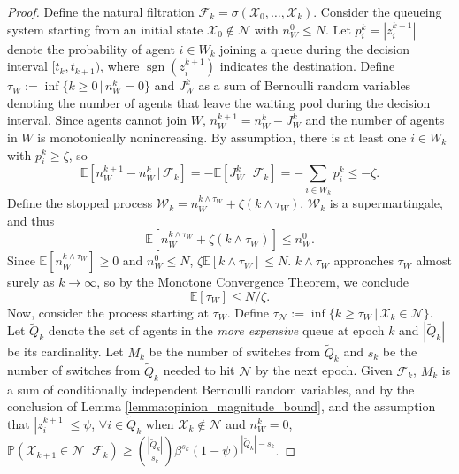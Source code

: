 \documentclass[conference]{IEEEtran}
\DeclareMathOperator{\sgn}{sgn}
\begin{document}
\begin{proof}
    Define the natural filtration $\mathcal{F}_k = \sigma(\mathcal{X}_0, \dots, \mathcal{X}_k)$. Consider the queueing system starting from an initial state $\mathcal{X}_0 \notin \mathcal{N}$ with $n^0_W \leq N$.
    Let $p^k_i = |z^{k+1}_i|$ denote the probability of agent $i \in W_k$ joining a queue during the decision interval $[t_{k}, t_{k+1})$, where $\sgn(z^{k+1}_i)$ indicates the destination. Define $\tau_W := \inf\{k \ge 0 \, | \, n^k_W = 0\}$ and
    $J^k_W$ as a sum of Bernoulli random variables denoting the number of agents that leave the waiting pool during the decision interval. 
    Since agents cannot join $W$, $n^{k+1}_W = n^k_W - J^k_W$ and the number of agents in $W$ is monotonically nonincreasing.
    By assumption, there is at least one $i \in W_k$ with $p^k_i \ge \zeta$, so
    \begin{equation*}
        \mathbb{E}[n^{k+1}_W - n^k_W \, | \, \mathcal{F}_k] = -\mathbb{E}[J^k_W \, | \, \mathcal{F}_k] = -\sum_{i \in W_k} p^k_i \leq - \zeta.
    \end{equation*}
    Define the stopped process $\mathcal{W}_k = n^{k \wedge \tau_W}_W + \zeta(k \wedge \tau_W)$. $\mathcal{W}_k$ is a supermartingale, and thus
    \begin{equation*}
        \mathbb{E}[n^{k \wedge \tau_W}_W + \zeta(k \wedge \tau_W)] \leq n^0_W.
    \end{equation*}
    Since $\mathbb{E}[n^{k \wedge \tau_W}_W] \ge 0$ and $n^0_W \leq N$, $\zeta \mathbb{E}[k \wedge \tau_W] \leq N.$
    $k \wedge \tau_W$ approaches $\tau_W$ almost surely as $k \rightarrow \infty$, so by the Monotone Convergence Theorem, we conclude
    \begin{equation}\label{eqn:expected_steps_to_clear_w}
        \mathbb{E}[\tau_{W} ] \leq N/\zeta. 
    \end{equation}
    Now, consider the process starting at $\tau_W$. Define $\tau_{\mathcal{N}} := \inf\{k \ge \tau_W \, | \, \mathcal{X}_k \in \mathcal{N}\}$. 
    Let $\widetilde{Q}_k$ denote the set of agents in the \emph{more expensive} queue at epoch $k$ and $|\widetilde{Q}_k|$ be its cardinality.
    Let $M_k$ be the number of switches from $\widetilde{Q}_k$ and $s_k$ be the number of switches from $\widetilde{Q}_k$ needed to hit $\mathcal{N}$ by the next epoch. 
    Given $\mathcal{F}_k$, $M_k$ is a sum of conditionally independent Bernoulli random variables, and by the conclusion of Lemma \ref{lemma:opinion_magnitude_bound}, and the assumption that $|z^{k+1}_i| \leq \psi$, $\forall i \in \widetilde{Q}_k$ when $\mathcal{X}_k \notin \mathcal{N}$ and $n^k_W = 0$, $\mathbb{P}(\mathcal{X}_{k+1} \in \mathcal{N} \, | \, \mathcal{F}_k) \ge  {|\widetilde{Q}_k| \choose s_k}\beta^{s_k}(1 - \psi)^{|\widetilde{Q}_k| - s_k}$.

\end{proof}
\end{document}
